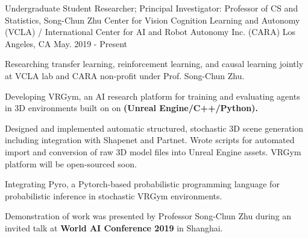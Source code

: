 \cventry
    {Undergraduate Student Researcher; Principal Investigator: Professor of CS and Statistics, Song-Chun Zhu} %
    {Center for Vision Cognition Learning and Autonomy (VCLA) / \newline
    International Center for AI and Robot Autonomy Inc. (CARA)} %
    {Los Angeles, CA} %
    {May. 2019 - Present} %
    {
    \begin{cvitems} %
        \item {Researching transfer learning, reinforcement learning, and causal learning jointly at VCLA lab and CARA non-profit under Prof. Song-Chun Zhu.}
        \item {Developing VRGym, an AI research platform for training and evaluating agents in
        3D environments built on on \textbf{(Unreal Engine/C++/Python).} } 
        \item {Designed and implemented automatic structured, stochastic 3D scene generation including integration with Shapenet and Partnet. 
        Wrote scripts for automated import and conversion of raw 3D model files into Unreal Engine assets. VRGym platform will be open-sourced soon.}
        \item {Integrating Pyro, a Pytorch-based probabilistic programming language for probabilistic inference in stochastic VRGym environments.}
        \item {Demonstration of work was presented by Professor Song-Chun Zhu during an invited talk at \textbf{World AI Conference 2019} in Shanghai.}
    \end{cvitems}
    }